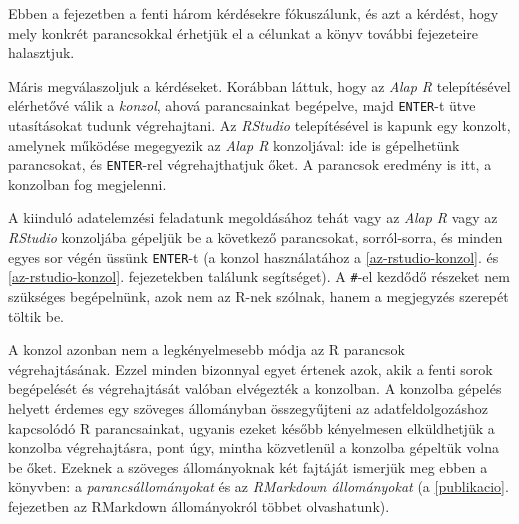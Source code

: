\documentclass[
]{book}
\newenvironment{Shaded}{\begin{snugshade}}{\end{snugshade}}
\newcommand{\AttributeTok}[1]{\textcolor[rgb]{0.77,0.63,0.00}{#1}}
\newcommand{\CommentTok}[1]{\textcolor[rgb]{0.56,0.35,0.01}{\textit{#1}}}
\newcommand{\FunctionTok}[1]{\textcolor[rgb]{0.00,0.00,0.00}{#1}}
\newcommand{\NormalTok}[1]{#1}
\newcommand{\SpecialCharTok}[1]{\textcolor[rgb]{0.00,0.00,0.00}{#1}}
\newcommand{\StringTok}[1]{\textcolor[rgb]{0.31,0.60,0.02}{#1}}
\begin{document}
Ebben a fejezetben a fenti három kérdésekre fókuszálunk, és azt a kérdést, hogy mely konkrét parancsokkal érhetjük el a célunkat a könyv további fejezeteire halasztjuk.

Máris megválaszoljuk a kérdéseket. Korábban láttuk, hogy az \emph{Alap R} telepítésével elérhetővé válik a \emph{konzol}, ahová parancsainkat begépelve, majd \texttt{ENTER}-t ütve utasításokat tudunk végrehajtani. Az \emph{RStudio} telepítésével is kapunk egy konzolt, amelynek működése megegyezik az \emph{Alap R} konzoljával: ide is gépelhetünk parancsokat, és \texttt{ENTER}-rel végrehajthatjuk őket. A parancsok eredmény is itt, a konzolban fog megjelenni.

A kiinduló adatelemzési feladatunk megoldásához tehát vagy az \emph{Alap R} vagy az \emph{RStudio} konzoljába gépeljük be a következő parancsokat, sorról-sorra, és minden egyes sor végén üssünk \texttt{ENTER}-t (a konzol használatához a \ref{az-rstudio-konzol}. és \ref{az-rstudio-konzol}. fejezetekben találunk segítséget). A \texttt{\#}-el kezdődő részeket nem szükséges begépelnünk, azok nem az R-nek szólnak, hanem a megjegyzés szerepét töltik be.

\begin{Shaded}
\end{Shaded}

A konzol azonban nem a legkényelmesebb módja az R parancsok végrehajtásának. Ezzel minden bizonnyal egyet értenek azok, akik a fenti sorok begépelését és végrehajtását valóban elvégezték a konzolban. A konzolba gépelés helyett érdemes egy szöveges állományban összegyűjteni az adatfeldolgozáshoz kapcsolódó R parancsainkat, ugyanis ezeket később kényelmesen elküldhetjük a konzolba végrehajtásra, pont úgy, mintha közvetlenül a konzolba gépeltük volna be őket. Ezeknek a szöveges állományoknak két fajtáját ismerjük meg ebben a könyvben: a \emph{parancsállományokat} és az \emph{RMarkdown állományokat} (a \ref{publikacio}. fejezetben az RMarkdown állományokról többet olvashatunk).
\end{document}

